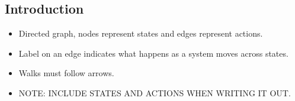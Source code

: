 \subsection{Introduction}

\begin{itemize}
    \item Directed graph, nodes represent states and edges represent actions.
    \item Label on an edge indicates what happens as a system moves across states.
    \item Walks must follow arrows.
    \item NOTE: INCLUDE STATES AND ACTIONS WHEN WRITING IT OUT.
\end{itemize}